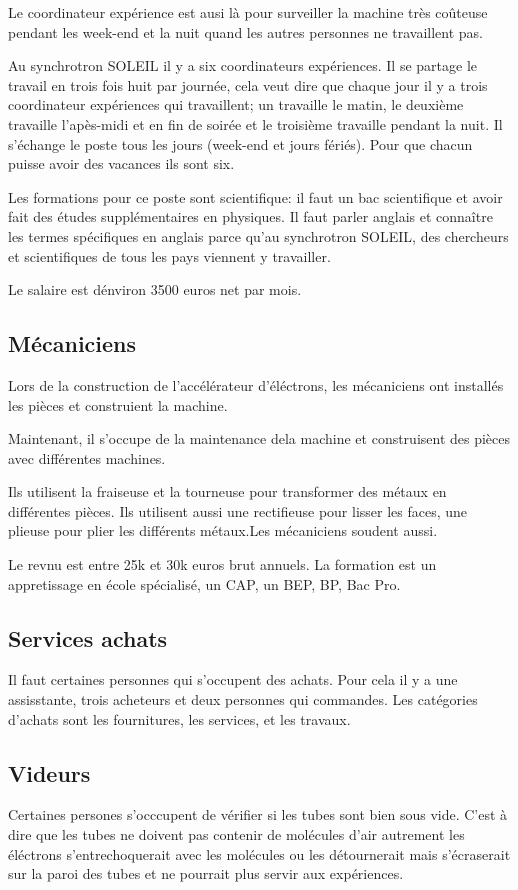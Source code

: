 			Le coordinateur expérience est ausi là pour surveiller la machine très coûteuse pendant les week-end et la nuit quand les autres personnes ne travaillent pas.
			
			Au synchrotron SOLEIL il y a six coordinateurs expériences. Il se partage le travail en trois fois huit par journée, 	cela veut dire que chaque jour il y a trois coordinateur expériences qui travaillent; un travaille le matin, le deuxième travaille l'apès-midi et en fin de soirée et le troisième travaille pendant la nuit. Il s'échange le poste tous les jours (week-end et jours fériés). Pour que chacun puisse avoir des vacances ils sont six.
			
			Les formations pour ce poste sont scientifique: il faut un bac scientifique et avoir fait des études supplémentaires en physiques. Il faut parler anglais et connaître les termes spécifiques en anglais parce qu'au synchrotron SOLEIL, des chercheurs et scientifiques de tous les pays viennent y travailler.
			
			Le salaire est dénviron 3500 euros net par mois.
		
		\subsection{Mécaniciens}
			Lors de la construction de l'accélérateur d'éléctrons, les mécaniciens ont installés les pièces et construient la machine. 
			
			Maintenant, il s'occupe de la maintenance dela machine et construisent des pièces avec différentes machines.
			
			Ils utilisent la fraiseuse et la tourneuse pour transformer des métaux en différentes pièces. Ils utilisent aussi une rectifieuse pour lisser les faces, une plieuse pour plier les différents métaux.Les mécaniciens soudent aussi.
			
			Le revnu est entre 25k et 30k euros brut annuels. La formation est un appretissage en école spécialisé, un CAP, un BEP, BP, Bac Pro.
		
		\subsection{Services achats}
			Il faut certaines personnes qui s'occupent des achats. Pour cela il y a une assisstante, trois acheteurs et deux personnes qui commandes. Les catégories d'achats sont les fournitures, les services, et les travaux.
		
		\subsection{Videurs}
			Certaines persones s'occcupent de vérifier si les tubes sont bien sous vide. C'est à dire que les tubes ne doivent pas contenir de molécules d'air autrement les éléctrons s'entrechoquerait avec les molécules ou les détournerait mais s'écraserait sur la paroi des tubes et ne pourrait plus 
			servir aux expériences.
			
